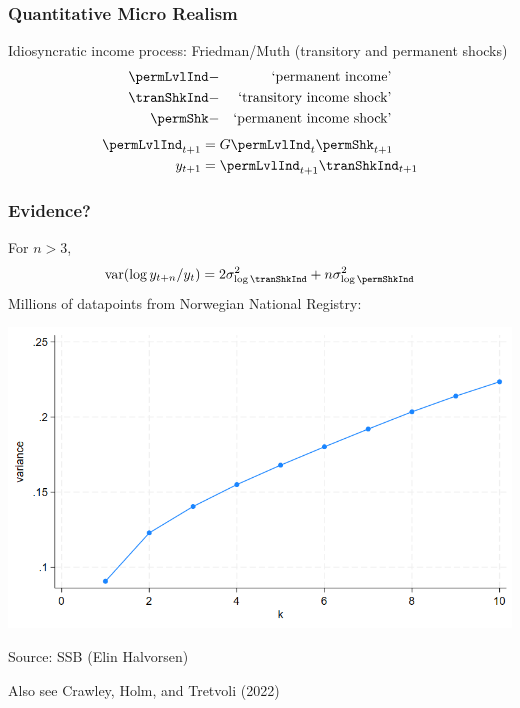 \documentclass[pdflatex,aspectratio=169]{beamer}
\renewcommand{\PermGroFac}{G}
\begin{document}
\begin{frame}
  \frametitle{Quantitative Micro Realism}

  Idiosyncratic income process: Friedman/Muth (transitory and permanent shocks)
  \providecommand{\permLvl}{}\renewcommand{\permLvl}{\permLvlInd}
  \begin{eqnarray}
    \permLvlInd & - & \text{`permanent income'} \\
\tranShkInd & - & \text{`transitory income shock'}  \\
    \permShk & - & \text{`permanent income shock'}
  \end{eqnarray}
  \begin{align*}
    \permLvlInd_{t+1} & = \PermGroFac \permLvlInd_{t} \permShk_{t+1} \\
    y_{t+1} &= \permLvlInd_{t+1}\tranShkInd_{t+1} \\
  \end{align*}
\end{frame}

\begin{frame}\frametitle{Evidence?}
  \providecommand{\var}{}\renewcommand{\var}{\mathrm{var}}
  For $n>3$,
  \begin{equation}
    \var(\log y_{t+n}/y_{t}) = 2 \sigma^{2}_{\log \tranShkInd} + n \sigma^{2}_{\log \permShkInd}
  \end{equation}
  Millions of datapoints from Norwegian National Registry:
  \begin{center}
    \includegraphics[width=0.5\linewidth]{./Figures/norway_income_change_variance.png}

    Source: SSB (Elin Halvorsen)
  \end{center}
  Also see Crawley, Holm, and Tretvoli (2022)
\end{frame}
\end{document}
